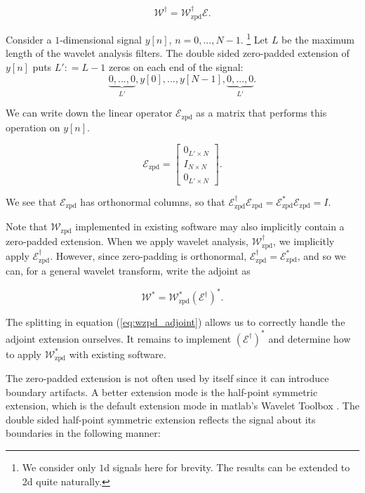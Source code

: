 \documentclass[journal]{IEEEtran}
\newcommand{\defeq}{\mathrel{\mathop:}=}
\begin{document}
\[ \mathcal{W}^\dagger = \mathcal{W}^\dagger_\text{zpd}\mathcal{E}. \] 

Consider a $1$-dimensional signal $y[n]$, $n=0,...,N-1$.  \footnote{We consider only $1$d signals here for brevity.  The results can be extended to 2d quite naturally.}  Let $L$ be the maximum length of the wavelet analysis filters.  The double sided zero-padded extension of $y[n]$ puts $L'\defeq L-1$ zeros on each end of the signal:
\[ \underbrace{0, ..., 0}_{L'}, y[0], ..., y[N-1], \underbrace{0, ..., 0}_{L'}. \]

\noindent We can write down the linear operator $\mathcal{E}_\text{zpd}$ as a matrix that performs this operation on $y[n]$.

\[ \mathcal{E}_\text{zpd} = \begin{bmatrix} 0_{L'\times N}\\ I_{N\times N}\\ 0_{L'\times N}\end{bmatrix}. \] 

   \noindent We see that $\mathcal{E}_\text{zpd}$ has orthonormal columns, so that ${\mathcal{E}_\text{zpd}^\dagger\mathcal{E}_\text{zpd} = \mathcal{E}_\text{zpd}^\ast\mathcal{E}_\text{zpd}=I}$.

   Note that $\mathcal{W}_\text{zpd}$ implemented in existing software may also implicitly contain a zero-padded extension.  When we apply wavelet analysis, $\mathcal{W}_\text{zpd}^\dagger$, we implicitly apply $\mathcal{E}_\text{zpd}^\dagger$.  However, since zero-padding is orthonormal, $\mathcal{E}_\text{zpd}^\dagger=\mathcal{E}_\text{zpd}^\ast$, and so we can, for a general wavelet transform, write the adjoint as 

\begin{equation}
\label{eq:wzpd_adjoint}
\mathcal{W}^\ast = \mathcal{W}_\text{zpd}^\ast\left(\mathcal{E}^\dagger\right)^\ast.
\end{equation}

\noindent The splitting in equation (\ref{eq:wzpd_adjoint}) allows us to correctly handle the adjoint extension ourselves.  It remains to implement $\left(\mathcal{E}^\dagger\right)^\ast$ and determine how to apply $\mathcal{W}^\ast_\text{zpd}$ with existing software.

The zero-padded extension is not often used by itself since it can introduce boundary artifacts.
 A better extension mode is the half-point symmetric extension, which is the default extension mode in {\sc matlab}'s Wavelet Toolbox \cite{strang_1996, matlab_wt_2015}.  The double sided half-point symmetric extension reflects the signal about its boundaries in the following manner:
\end{document}
